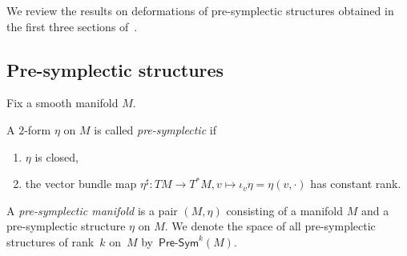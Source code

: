 \documentclass[pdftex]{sigma}
\numberwithin{equation}{section}
\newcommand{\Presym}{\mathsf{Pre}\textrm{-}\mathsf{Sym}}
\begin{document}
{We review the results on deformations of pre-symplectic structures obtained in the first three sections of~\cite{SZPre}.}

\subsection{Pre-symplectic structures}\label{subsection: pre-symplectic structures}

Fix a smooth manifold $M$.

\begin{Definition}\label{definition: pre-symplectic}A $2$-form $\eta$ on $M$ is called \emph{pre-symplectic} if
\begin{enumerate}\itemsep=0pt
\item[1)] $\eta$ is closed,
\item[2)] the vector bundle map $\eta^\sharp\colon TM \to T^*M, v\mapsto \iota_v\eta = \eta(v,\cdot)$ has constant rank.
\end{enumerate}

A \emph{pre-symplectic manifold} is a pair $(M,\eta)$ consisting of a manifold $M$ and a pre-symplectic structure $\eta$ on $M$. We denote the space of all pre-symplectic structures of rank~$k$ on~$M$ by~$\Presym^k(M)$.
\end{Definition}
\end{document}
